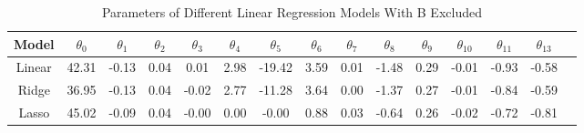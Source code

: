 \begin{table}[H]
\centering
\caption{Parameters of Different Linear Regression Models With B Excluded}
\label{tab:modelsParamsExcB}
\begin{tabular}{ccccccccccccccc}
\toprule
Model & $\theta_0$ & $\theta_{1}$ & $\theta_{2}$ & $\theta_{3}$ & $\theta_{4}$ & $\theta_{5}$ & $\theta_{6}$ & $\theta_{7}$ & $\theta_{8}$ & $\theta_{9}$ & $\theta_{10}$ & $\theta_{11}$ & $\theta_{13}$ \\
\midrule
Linear & 42.31 & -0.13 & 0.04 & 0.01 & 2.98 & -19.42 & 3.59 & 0.01 & -1.48 & 0.29 & -0.01 & -0.93 & -0.58 \\
Ridge & 36.95 & -0.13 & 0.04 & -0.02 & 2.77 & -11.28 & 3.64 & 0.00 & -1.37 & 0.27 & -0.01 & -0.84 & -0.59 \\
Lasso & 45.02 & -0.09 & 0.04 & -0.00 & 0.00 & -0.00 & 0.88 & 0.03 & -0.64 & 0.26 & -0.02 & -0.72 & -0.81 \\
\bottomrule
\end{tabular}
\end{table}
